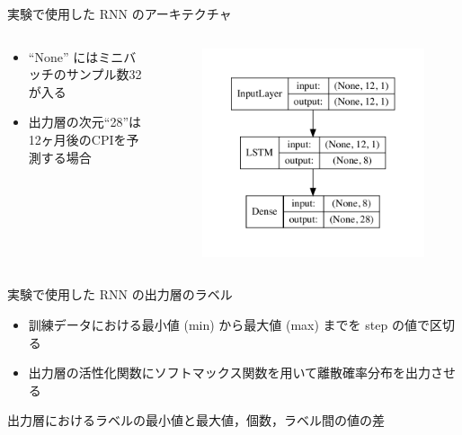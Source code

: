 \documentclass[dvipdfmx,aspectratio=169]{beamer}
\begin{document}
\begin{frame}{実験で使用した RNN のアーキテクチャ}
\begin{columns}
  \begin{column}{0.5\textwidth}
    \begin{itemize}
      \item ``None'' にはミニバッチのサンプル数32が入る
      \item 出力層の次元``28''は12ヶ月後のCPIを予測する場合
    \end{itemize}
  \end{column}
  \begin{column}{0.5\textwidth}
    \begin{figure}
      \centering
      \includegraphics[width=\columnwidth]{experiment-machine_model}
    \end{figure}
  \end{column}
\end{columns}
\end{frame}

\begin{frame}{実験で使用した RNN の出力層のラベル}
\begin{itemize}
  \item 訓練データにおける最小値 (min) から最大値 (max) までを step の値で区切る
  \item 出力層の活性化関数にソフトマックス関数を用いて離散確率分布を出力させる
\end{itemize}
\begin{table}
  \caption{出力層におけるラベルの最小値と最大値，個数，ラベル間の値の差}
  \begin{center}
    \small
    
  \end{center}
\end{table}
\end{frame}
\end{document}
